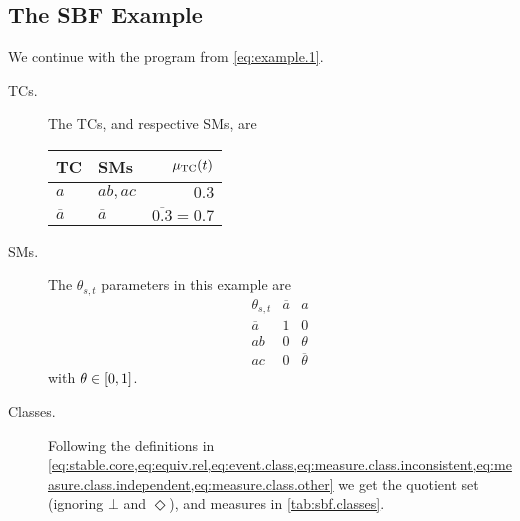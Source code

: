 \documentclass{article}
\newcommand{\at}[1]{\ensuremath{\!\del{#1}}}
\newcommand{\co}[1]{\ensuremath{\overline{#1}}}
\newcommand{\pwcfname}{\ensuremath{\mu_{\textrm{TC}}}}
\newcommand{\pwc}[1]{\ensuremath{\pwcfname\at{#1}}}
\newcommand{\inconsistent}{\bot}
\newcommand{\indepclass}{\ensuremath{\Diamond}}
\begin{document}
\subsection{The SBF Example}\label{subsec:sbf.example}

We continue with the program from \cref{eq:example.1}.

\begin{description}
	\item[\Aclp{TC}.] The \aclp{TC}, and respective \aclp{SM}, are
		  \begin{center}
			  \begin{tabular}{ll|r}
				  \textbf{\Acl{TC}} & \textbf{\Aclp{SM}} & \textbf{$\pwc{t}$} \\
				  \hline
				  $a$               & $ab, ac$           & $0.3$              \\
				  $\co{a}$          & $\co{a}$           & $\co{0.3} = 0.7$
			  \end{tabular}
		  \end{center}

	\item[\Aclp{SM}.] The $\theta_{s,t}$ parameters in this example are
		  $$
			  \begin{array}{l|cc}
				  \theta_{s,t} & \co{a} & a           \\
				  \hline
				  \co{a}       & 1      & 0           \\
				  ab           & 0      & \theta      \\
				  ac           & 0      & \co{\theta}
			  \end{array}
		  $$
		  with $\theta \in \intcc{0, 1}$.

		\item[Classes.] Following the definitions in
		  \cref{eq:stable.core,eq:equiv.rel,eq:event.class,eq:measure.class.inconsistent,eq:measure.class.independent,eq:measure.class.other}
		  we get the quotient set (ignoring $\inconsistent$ and
		  $\indepclass$), and measures in \cref{tab:sbf.classes}.



\end{description}
\end{document}
